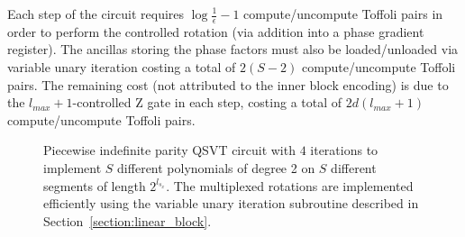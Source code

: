 \documentclass[a4paper,twocolumn,,accepted=2025-05-27]{quantumarticle}
\theoremstyle{empty}
\begin{document}
Each step of the circuit requires $\log\frac{1}{\epsilon} -1$ compute/uncompute Toffoli pairs in order to perform the controlled rotation (via addition into a phase gradient register). The ancillas storing the phase factors must also be loaded/unloaded via variable unary iteration costing a total of $2(S-2)$ compute/uncompute Toffoli pairs. The remaining cost (not attributed to the inner block encoding) is due to the $l_{max}+1$-controlled Z gate in each step, costing a total of $2d(l_{max}+1)$ compute/uncompute Toffoli pairs.
\begin{figure}[htbp]
\centering

\caption{Piecewise indefinite parity QSVT circuit with $4$ iterations to implement $S$ different polynomials of degree 2 on $S$ different segments of length $2^{l_{s_x}}$. The multiplexed rotations are implemented efficiently using the variable unary iteration subroutine described in Section~\ref{section:linear_block}.}
\label{fig:circuit}
\end{figure}
\end{document}
